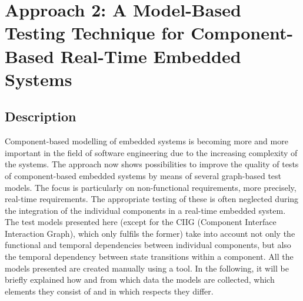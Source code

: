 \section{Approach 2: A Model-Based Testing Technique for Component-Based Real-Time
Embedded Systems\label{sec:Approach-2}}

\subsection{Description}

Component-based modelling of embedded systems is becoming more and
more important in the field of \textquotedbl software engineering\textquotedbl{}
due to the increasing complexity of the systems. The approach now
shows possibilities to improve the quality of tests of component-based
embedded systems by means of several graph-based test models. The
focus is particularly on non-functional requirements, more precisely,
real-time requirements. The appropriate testing of these is often
neglected during the integration of the individual components in a
real-time embedded system. The test models presented here (except
for the CIIG (Component Interface Interaction Graph), which only fulfils
the former) take into account not only the functional and temporal
dependencies between individual components, but also the temporal
dependency between state transitions within a component. All the models
presented are created manually using a tool. In the following, it
will be briefly explained how and from which data the models are collected,
which elements they consist of and in which respects they differ.


